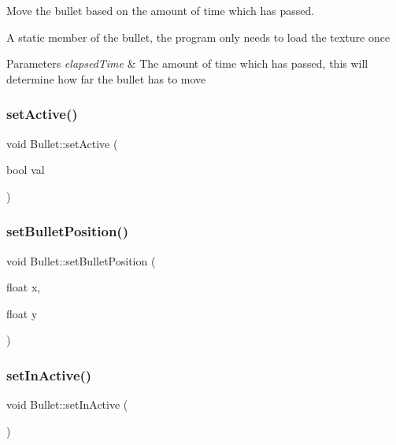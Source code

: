 Move the bullet based on the amount of time which has passed. 

A static member of the bullet, the program only needs to load the texture once 
\begin{DoxyParams}{Parameters}
{\em elapsed\+Time} & The amount of time which has passed, this will determine how far the bullet has to move \\
\hline
\end{DoxyParams}
\mbox{\label{class_bullet_adfd1d1a317bd18f9d6aec65630301ae2}} 
\subsubsection{\texorpdfstring{set\+Active()}{setActive()}}
{\footnotesize\ttfamily void Bullet\+::set\+Active (\begin{DoxyParamCaption}\item[{bool}]{val }\end{DoxyParamCaption})\hspace{0.3cm}{\ttfamily [inline]}}

\mbox{\label{class_bullet_af6e316869e595d8f0b2af44dd80a8dd6}} 
\subsubsection{\texorpdfstring{set\+Bullet\+Position()}{setBulletPosition()}}
{\footnotesize\ttfamily void Bullet\+::set\+Bullet\+Position (\begin{DoxyParamCaption}\item[{float}]{x,  }\item[{float}]{y }\end{DoxyParamCaption})\hspace{0.3cm}{\ttfamily [inline]}}

\mbox{\label{class_bullet_afe143dafb173b03b6f35fa9472cbe465}} 
\subsubsection{\texorpdfstring{set\+In\+Active()}{setInActive()}}
{\footnotesize\ttfamily void Bullet\+::set\+In\+Active (\begin{DoxyParamCaption}{ }\end{DoxyParamCaption})}



